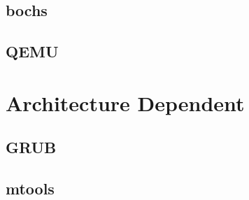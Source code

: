 %
%

\subsection{bochs}

%
%

\subsection{QEMU}

%
%

\section{Architecture Dependent}

%
%

\subsection{GRUB}

%
%

\subsection{mtools}
